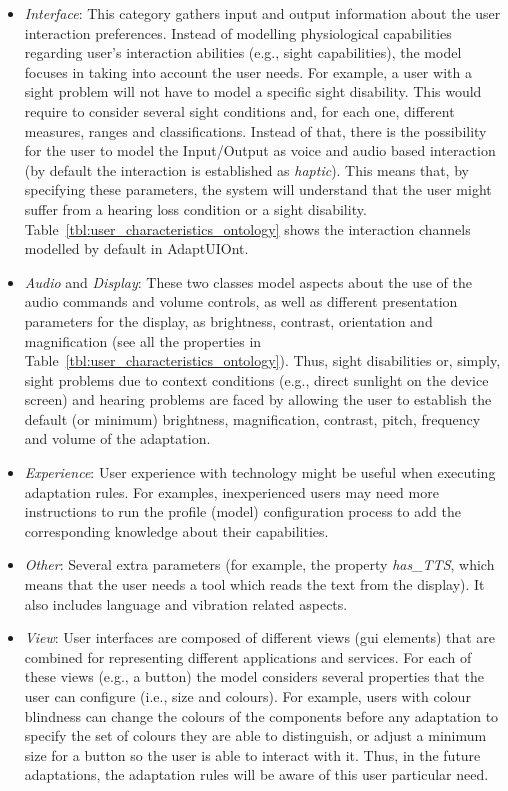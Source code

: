 \begin{itemize}
  \item \textit{Interface}: This category gathers input and output information
  about the user interaction preferences. Instead of modelling physiological
  capabilities regarding user's interaction abilities (e.g., sight capabilities),
  the model focuses in taking into account the user needs. For example, a user
  with a sight problem will not have to model a specific sight disability. This
  would require to consider several sight conditions and, for each one, different
  measures, ranges and classifications. Instead of that, there is the possibility
  for the user to model the Input/Output as voice and audio based interaction
  (by default the interaction is established as \textit{haptic}). This means that,
  by specifying these parameters, the system will understand that the user might
  suffer from a hearing loss condition or a sight disability.
  Table~\ref{tbl:user_characteristics_ontology} shows the interaction channels
  modelled by default in AdaptUIOnt.

  \item \textit{Audio} and \textit{Display}: These two classes model aspects
  about the use of the audio commands and volume controls, as well as different
  presentation parameters for the display, as brightness, contrast, orientation
  and magnification (see all the properties in Table~\ref{tbl:user_characteristics_ontology}).
  Thus, sight disabilities or, simply, sight problems due to context conditions
  (e.g., direct sunlight on the device screen) and hearing problems are faced by
  allowing the user to establish the default (or minimum) brightness, magnification,
  contrast, pitch, frequency and volume of the adaptation.
    
  \item \textit{Experience}: User experience with technology might be useful when
  executing adaptation rules. For examples, inexperienced users may need more
  instructions to run the profile (model) configuration process to add the
  corresponding knowledge about their capabilities.
  
  \item \textit{Other}: Several extra parameters (for example, the property
  \textit{has\_TTS}, which means that the user needs a tool which reads the text from
  the display). It also includes language and vibration related aspects.
  
  \item \textit{View}: User interfaces are composed of different views (\acs{gui} 
  elements) that are combined for representing different applications and services. 
  For each of these views (e.g., a button) the model considers several properties 
  that the user can configure (i.e., size and colours). For example, users with 
  colour blindness can change the colours of the components before any adaptation 
  to specify the set of colours they are able to distinguish, or adjust a 
  minimum size for a button so the user is able to interact with it. Thus, in 
  the future adaptations, the adaptation rules will be aware of this user 
  particular need.
  

\end{itemize}

